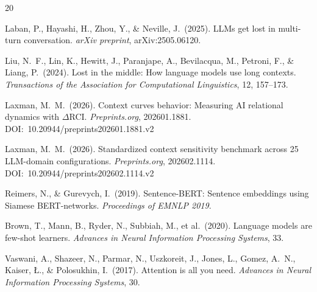 \documentclass[twoside,11pt]{article}
\begin{document}
\begin{thebibliography}{20}

Laban, P., Hayashi, H., Zhou, Y., \& Neville, J.\ (2025).
LLMs get lost in multi-turn conversation.
{\it arXiv preprint}, arXiv:2505.06120.

Liu, N.\ F., Lin, K., Hewitt, J., Paranjape, A., Bevilacqua, M., Petroni, F.,
\& Liang, P.\ (2024).
Lost in the middle: How language models use long contexts.
{\it Transactions of the Association for Computational Linguistics}, 12, 157--173.

Laxman, M.\ M.\ (2026).
Context curves behavior: Measuring AI relational dynamics with $\Delta$RCI.
{\it Preprints.org}, 202601.1881. DOI:~10.20944/preprints202601.1881.v2

Laxman, M.\ M.\ (2026).
Standardized context sensitivity benchmark across 25 LLM-domain configurations.
{\it Preprints.org}, 202602.1114. DOI:~10.20944/preprints202602.1114.v2

Reimers, N., \& Gurevych, I.\ (2019).
Sentence-BERT: Sentence embeddings using Siamese BERT-networks.
{\it Proceedings of EMNLP 2019}.

Brown, T., Mann, B., Ryder, N., Subbiah, M., et al.\ (2020).
Language models are few-shot learners.
{\it Advances in Neural Information Processing Systems}, 33.

Vaswani, A., Shazeer, N., Parmar, N., Uszkoreit, J., Jones, L., Gomez, A.\ N.,
Kaiser, \L., \& Polosukhin, I.\ (2017).
Attention is all you need.
{\it Advances in Neural Information Processing Systems}, 30.

\end{thebibliography}
\end{document}

